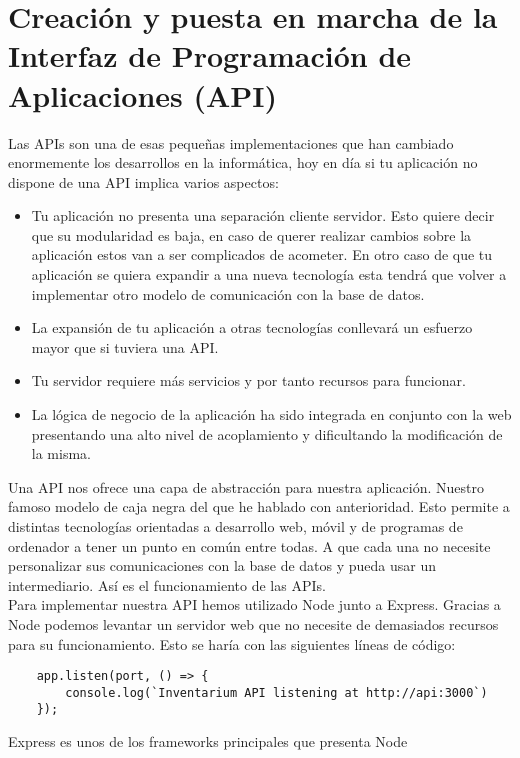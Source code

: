 \section{Creación y puesta en marcha de la Interfaz de Programación de Aplicaciones (API)}
Las APIs son una de esas pequeñas implementaciones que han cambiado enormemente los desarrollos en la informática, hoy en día si tu aplicación no dispone de una API implica varios aspectos:

\begin{itemize}
    \item Tu aplicación no presenta una separación cliente servidor. Esto quiere decir que su modularidad es baja, en caso de querer realizar cambios sobre la aplicación estos van a ser complicados de acometer. En otro caso de que tu aplicación se quiera expandir a una nueva tecnología esta tendrá que volver a implementar otro modelo de comunicación con la base de datos.
    \item La expansión de tu aplicación a otras tecnologías conllevará un esfuerzo mayor que si tuviera una API.
    \item Tu servidor requiere más servicios y por tanto recursos para funcionar.
    \item La lógica de negocio de la aplicación ha sido integrada en conjunto con la web presentando una alto nivel de acoplamiento y dificultando la modificación de la misma.
\end{itemize}

Una API nos ofrece una capa de abstracción para nuestra aplicación. Nuestro famoso modelo de caja negra del que he hablado con anterioridad. Esto permite a distintas tecnologías orientadas a desarrollo web, móvil y de programas de ordenador a tener un punto en común entre todas. A que cada una no necesite personalizar sus comunicaciones con la base de datos y pueda usar un intermediario. Así es el funcionamiento de las APIs.
\\Para implementar nuestra API hemos utilizado Node junto a Express. Gracias a Node podemos levantar un servidor web que no necesite de demasiados recursos para su funcionamiento. Esto se haría con las siguientes líneas de código:
\begin{verbatim}
    app.listen(port, () => {
        console.log(`Inventarium API listening at http://api:3000`)
    });
\end{verbatim}
Express es unos de los frameworks principales que presenta Node